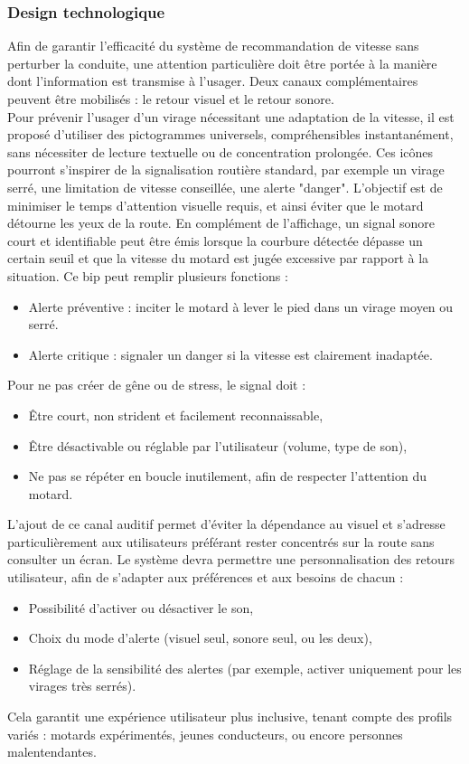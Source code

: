 \subsubsection{Design technologique}
Afin de garantir l’efficacité du système de recommandation de vitesse sans perturber la conduite, une attention particulière doit être portée à la manière dont l’information est transmise à l’usager. Deux canaux complémentaires peuvent être mobilisés : le retour visuel et le retour sonore.\\
Pour prévenir l’usager d’un virage nécessitant une adaptation de la vitesse, il est proposé d’utiliser des pictogrammes universels, compréhensibles instantanément, sans nécessiter de lecture textuelle ou de concentration prolongée. Ces icônes pourront s’inspirer de la signalisation routière standard, par exemple un virage serré, une limitation de vitesse conseillée, une alerte "danger".
L'objectif est de minimiser le temps d’attention visuelle requis, et ainsi éviter que le motard détourne les yeux de la route.
En complément de l’affichage, un signal sonore court et identifiable peut être émis lorsque la courbure détectée dépasse un certain seuil et que la vitesse du motard est jugée excessive par rapport à la situation.
Ce bip peut remplir plusieurs fonctions :
\begin{itemize}
    \item Alerte préventive : inciter le motard à lever le pied dans un virage moyen ou serré.
    \item Alerte critique : signaler un danger si la vitesse est clairement inadaptée.
\end{itemize}
Pour ne pas créer de gêne ou de stress, le signal doit :
\begin{itemize}
    \item Être court, non strident et facilement reconnaissable,
    \item Être désactivable ou réglable par l’utilisateur (volume, type de son),
    \item Ne pas se répéter en boucle inutilement, afin de respecter l’attention du motard.
\end{itemize}
L’ajout de ce canal auditif permet d’éviter la dépendance au visuel et s’adresse particulièrement aux utilisateurs préférant rester concentrés sur la route sans consulter un écran.
Le système devra permettre une personnalisation des retours utilisateur, afin de s’adapter aux préférences et aux besoins de chacun :
\begin{itemize}
    \item Possibilité d’activer ou désactiver le son,
    \item Choix du mode d’alerte (visuel seul, sonore seul, ou les deux),
    \item Réglage de la sensibilité des alertes (par exemple, activer uniquement pour les virages très serrés).
\end{itemize}
Cela garantit une expérience utilisateur plus inclusive, tenant compte des profils variés : motards expérimentés, jeunes conducteurs, ou encore personnes malentendantes.

